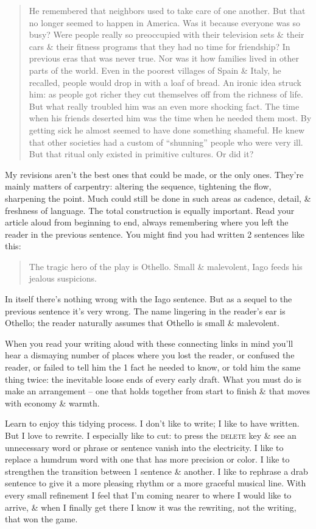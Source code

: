 \documentclass{article}
\begin{document}
\begin{quotation}
	He remembered that neighbors used to take care of one another. But that no longer seemed to happen in America. Was it because everyone was so busy? Were people really so preoccupied with their television sets \& their cars \& their fitness programs that they had no time for friendship? In previous eras that was never true. Nor was it how families lived in other parts of the world. Even in the poorest villages of Spain \& Italy, he recalled, people would drop in with a loaf of bread. An ironic idea struck him: as people got richer they cut themselves off from the richness of life. But what really troubled him was an even more shocking fact. The time when his friends deserted him was the time when he needed them most. By getting sick he almost seemed to have done something shameful. He knew that other societies had a custom of ``shunning'' people who were very ill. But that ritual only existed in primitive cultures. Or did it?
\end{quotation}
My revisions aren't the best ones that could be made, or the only ones. They're mainly matters of carpentry: altering the sequence, tightening the flow, sharpening the point. Much could still be done in such areas as cadence, detail, \& freshness of language. The total construction is equally important. Read your article aloud from beginning to end, always remembering where you left the reader in the previous sentence. You might find you had written 2 sentences like this:
\begin{quotation}
	The tragic hero of the play is Othello. Small \& malevolent, Iago feeds his jealous suspicions.
\end{quotation}
In itself there's nothing wrong with the Iago sentence. But as a sequel to the previous sentence it's very wrong. The name lingering in the reader's ear is Othello; the reader naturally assumes that Othello is small \& malevolent.

When you read your writing aloud with these connecting links in mind you'll hear a dismaying number of places where you lost the reader, or confused the reader, or failed to tell him the 1 fact he needed to know, or told him the same thing twice: the inevitable loose ends of every early draft. What you must do is make an arrangement -- one that holds together from start to finish \& that moves with economy \& warmth.

Learn to enjoy this tidying process. I don't like to write; I like to have written. But I love to rewrite. I especially like to cut: to press the \textsc{delete} key \& see an unnecessary word or phrase or sentence vanish into the electricity. I like to replace a humdrum word with one that has more precision or color. I like to strengthen the transition between 1 sentence \& another. I like to rephrase a drab sentence to give it a more pleasing rhythm or a more graceful musical line. With every small refinement I feel that I'm coming nearer to where I would like to arrive, \& when I finally get there I know it was the rewriting, not the writing, that won the game.
\end{document}
